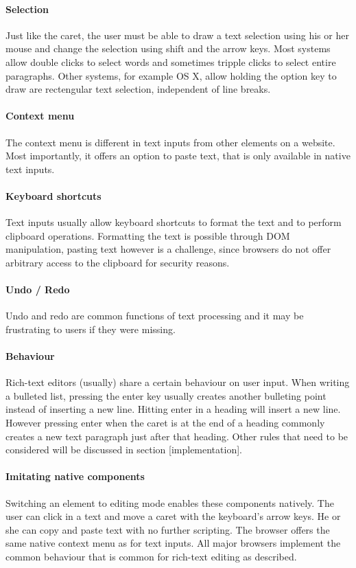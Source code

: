 \paragraph{Selection} Just like the caret, the user must be able to draw a text selection using his or her mouse and change the selection using shift and the arrow keys. Most systems allow double clicks to select words and sometimes tripple clicks to select entire paragraphs. Other systems, for example OS X, allow holding the option key to draw are rectengular text selection, independent of line breaks.

\paragraph{Context menu} The context menu is different in text inputs from other elements on a website. Most importantly, it offers an option to paste text, that is only available in native text inputs.

\paragraph{Keyboard shortcuts} Text inputs usually allow keyboard shortcuts to format the text and to perform clipboard operations. Formatting the text is possible through DOM manipulation, pasting text however is a challenge, since browsers do not offer arbitrary access to the clipboard for security reasons.

\paragraph{Undo / Redo} Undo and redo are common functions of text processing and it may be frustrating to users if they were missing.

\paragraph{Behaviour} Rich-text editors (usually) share a certain behaviour on user input. When writing a bulleted list, pressing the enter key usually creates another bulleting point instead of inserting a new line. Hitting enter in  a heading will insert a new line. However pressing enter when the caret is at the end of a heading commonly creates a new text paragraph just after that heading. Other rules that need to be considered will be discussed in section [implementation].

\paragraph{Imitating native components} Switching an element to editing mode enables these components natively. The user can click in a text and move a caret with the keyboard's arrow keys. He or she can copy and paste text with no further scripting. The browser offers the same native context menu as for text inputs. All major browsers implement the common behaviour that is common for rich-text editing as described.

